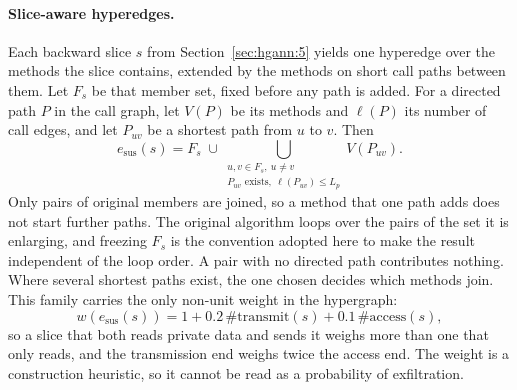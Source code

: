 \paragraph{Slice-aware hyperedges.} Each backward slice $s$ from Section~\ref{sec:hgann:5} yields
one hyperedge over the methods the slice contains, extended by the methods on short call paths
between them. Let $F_s$ be that member set, fixed before any path is added. For a directed path $P$
in the call graph, let $V(P)$ be its methods and $\ell(P)$ its number of call edges, and let
$P_{uv}$ be a shortest path from $u$ to $v$. Then
\begin{equation}
  e_{\text{sus}}(s) = F_s \;\cup
  \bigcup_{\substack{u, v \in F_s,\ u \ne v\\ P_{uv} \text{ exists},\ \ell(P_{uv}) \le L_p}}
  V(P_{uv}) .
  \label{eq:hgann:sus}
\end{equation}
Only pairs of original members are joined, so a method that one path adds does not start further
paths. The original algorithm loops over the pairs of the set it is enlarging, and freezing $F_s$ is
the convention adopted here to make the result independent of the loop order. A pair with no
directed path contributes nothing. Where several shortest paths exist, the one chosen decides which
methods join. This family carries the only non-unit weight in the hypergraph:
\begin{equation}
  w(e_{\text{sus}}(s)) = 1 + 0.2\,\#\text{transmit}(s) + 0.1\,\#\text{access}(s) ,
  \label{eq:hgann:weight}
\end{equation}
so a slice that both reads private data and sends it weighs more than one that only reads, and the
transmission end weighs twice the access end. The weight is a construction heuristic, so it cannot
be read as a probability of exfiltration.

